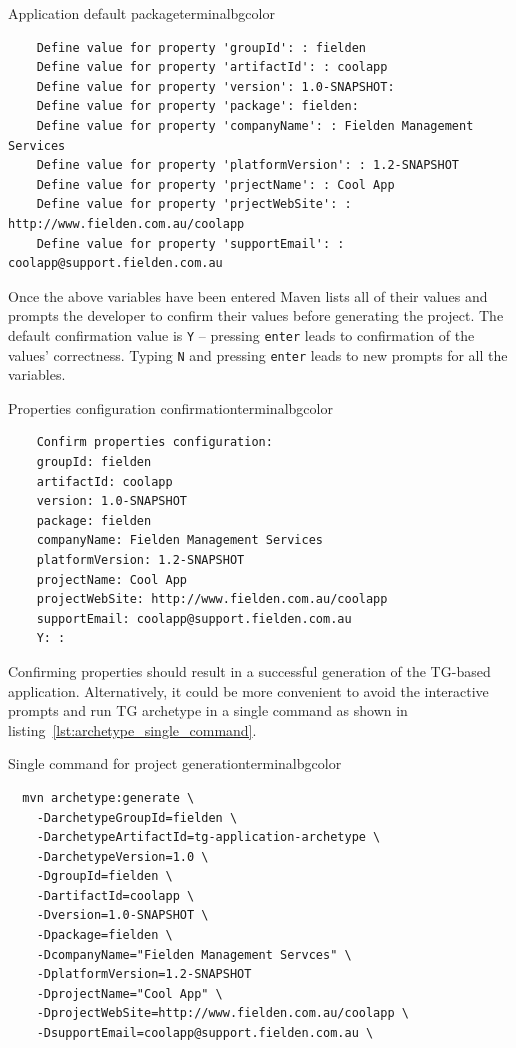 \begin{enumerate}
    \begin{code}{Application default package}{\label{lst::archetype-package}}{terminalbgcolor}
      \begin{lstlisting}
	Define value for property 'groupId': : fielden		
	Define value for property 'artifactId': : coolapp
	Define value for property 'version': 1.0-SNAPSHOT:
	Define value for property 'package': fielden:	
	Define value for property 'companyName': : Fielden Management Services
	Define value for property 'platformVersion': : 1.2-SNAPSHOT
	Define value for property 'prjectName': : Cool App
	Define value for property 'prjectWebSite': : http://www.fielden.com.au/coolapp
	Define value for property 'supportEmail': : coolapp@support.fielden.com.au
      \end{lstlisting}
    \end{code}

  \end{enumerate}

  Once the above variables have been entered Maven lists all of their values and prompts the developer to confirm their values before generating the project. 
  The default confirmation value is \texttt{Y} -- pressing \texttt{enter} leads to confirmation of the values' correctness. 
  Typing \texttt{N} and pressing \texttt{enter} leads to new prompts for all the variables.
  
  \begin{code}{Properties configuration confirmation}{\label{lst:properties_confirmation}}{terminalbgcolor}
      \begin{lstlisting}
	Confirm properties configuration:
	groupId: fielden
	artifactId: coolapp
	version: 1.0-SNAPSHOT
	package: fielden
	companyName: Fielden Management Services
	platformVersion: 1.2-SNAPSHOT
	projectName: Cool App
	projectWebSite: http://www.fielden.com.au/coolapp
	supportEmail: coolapp@support.fielden.com.au
	Y: :
      \end{lstlisting}
  \end{code}

  Confirming properties should result in a successful generation of the TG-based application.
  Alternatively, it could be more convenient to avoid the interactive prompts and run TG archetype in a single command as shown in listing~\ref{lst:archetype_single_command}.

  \begin{code}{Single command for project generation}{\label{lst:archetype_single_command}}{terminalbgcolor}
      \begin{lstlisting}
  mvn archetype:generate \
	-DarchetypeGroupId=fielden \
	-DarchetypeArtifactId=tg-application-archetype \
	-DarchetypeVersion=1.0 \
	-DgroupId=fielden \
	-DartifactId=coolapp \
	-Dversion=1.0-SNAPSHOT \
	-Dpackage=fielden \
	-DcompanyName="Fielden Management Servces" \
	-DplatformVersion=1.2-SNAPSHOT
	-DprojectName="Cool App" \
	-DprojectWebSite=http://www.fielden.com.au/coolapp \
	-DsupportEmail=coolapp@support.fielden.com.au \        
      \end{lstlisting}
  \end{code}

